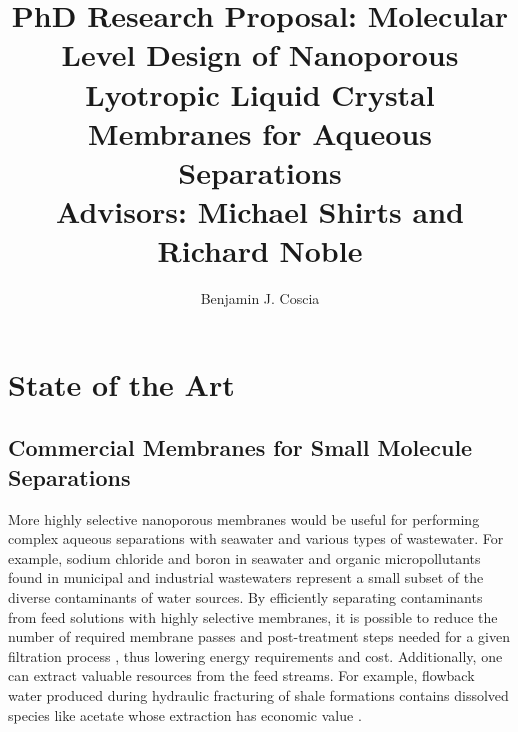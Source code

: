 \documentclass{article}
\title{PhD Research Proposal: Molecular Level Design of Nanoporous Lyotropic Liquid
Crystal Membranes for Aqueous Separations \\ \vspace{0.5cm}
\large Advisors: Michael Shirts and Richard Noble}
\author{Benjamin J. Coscia}
\begin{document}
  \graphicspath{{./figures/}}

  \maketitle
  \thispagestyle{empty}
  \clearpage
  \setcounter{page}{1} %

  \section{State of the Art}\label{section:state-of-the-art}

  \subsection*{Commercial Membranes for Small Molecule Separations}
  
  
  
  More highly selective nanoporous membranes would be useful for 
  performing complex aqueous separations with seawater and various
  types of wastewater. For example, sodium chloride and boron in seawater 
  \cite{fritzmann_state---art_2007} and organic micropollutants found in
  municipal and industrial wastewaters \cite{schwarzenbach_challenge_2006}
  represent a small subset of the diverse contaminants of water sources. 
  By efficiently separating contaminants from feed solutions with
  highly selective membranes, it is possible to reduce the number of 
  required membrane passes and post-treatment steps needed for a given 
  filtration process \cite{werber_materials_2016}, thus lowering energy 
  requirements and cost. Additionally, one can extract valuable 
  resources from the feed streams. For example, flowback water produced 
  during hydraulic fracturing of shale formations contains dissolved 
  species like acetate whose extraction has economic value \cite{dischinger_application_2017}.
\end{document}
